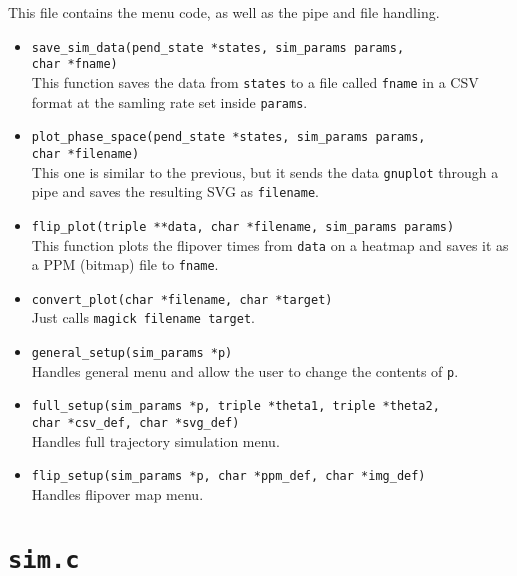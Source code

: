 \documentclass[a4paper,10pt]{article}
\begin{document}
This file contains the menu code, as well as the pipe and file handling.
\begin{itemize}
 \item \texttt{save\_sim\_data(pend\_state *states, sim\_params params,\\char *fname)}\\
 This function saves the data from \texttt{states} to a file called \texttt{fname} in
 a CSV format at the samling rate set inside \texttt{params}.
 \item \texttt{plot\_phase\_space(pend\_state *states, sim\_params params,\\char *filename)}\\
 This one is similar to the previous, but it sends the data \texttt{gnuplot} through a pipe and saves
 the resulting SVG as \texttt{filename}.
 \item \texttt{flip\_plot(triple **data, char *filename, sim\_params params)}\\
 This function plots the flipover times from \texttt{data} on a heatmap and saves it as a PPM (bitmap)
 file to \texttt{fname}.
 \item \texttt{convert\_plot(char *filename, char *target)}\\
 Just calls \texttt{magick filename target}.
 \item \texttt{general\_setup(sim\_params *p)}\\
 Handles general menu and allow the user to change the contents of \texttt{p}.
 \item \texttt{full\_setup(sim\_params *p, triple *theta1, triple *theta2,\\
 char *csv\_def, char *svg\_def)}\\
 Handles full trajectory simulation menu.
 \item \texttt{flip\_setup(sim\_params *p, char *ppm\_def, char *img\_def)}\\
 Handles flipover map menu.
\end{itemize}

\section{\texttt{sim.c}}
\end{document}
